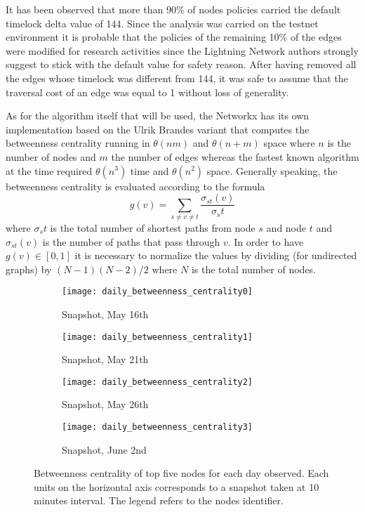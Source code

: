 	It has been observed that more than 90\% of nodes policies carried the default timelock delta value of 144. Since the analysis was carried on the testnet environment it is probable that the policies of the remaining 10\% of the edges were modified for research activities since the Lightning Network authors strongly suggest to stick with the default value for safety reason. After having removed all the edges whose timelock was different from 144, it was safe to assume that the traversal cost of an edge was equal to 1 without loss of generality.
	
	As for the algorithm itself that will be used, the Networkx has its own implementation based on the Ulrik Brandes \cite{Brandes2001} variant that computes the betweenness centrality running in $\theta(nm)$ and $\theta(n + m)$ space where $n$ is the number of nodes and $m$ the number of edges whereas the fastest known algorithm at the time required $\theta(n^3)$ time and $\theta(n^2)$ space.	Generally speaking, the betweenness centrality is evaluated according to the formula 
	\begin{equation}
		g(v) = \sum_{s \neq v \neq t}{\frac{\sigma_{st}(v) }{\sigma_st}}
	\end{equation}
	where $\sigma_st$ is the total number of shortest paths from node $s$ and node $t$ and $\sigma_{st}(v)$ is the number of paths that pass through $v$. In order to have $g(v) \in [0, 1]$ it is necessary to normalize the values by dividing (for undirected graphs) by $(N-1)(N-2)/2$ where $N$ is the total number of nodes.

	\begin{figure}[htbp]
		\centering
		\begin{subfigure}{0.6\textwidth}
			\centering
			\texttt{[image: daily\_betweenness\_centrality0]}
			\caption{Snapshot, May 16th}
			\label{daily_beetwenness0}
		\end{subfigure}
		\begin{subfigure}{0.6\textwidth}
			\centering
			\texttt{[image: daily\_betweenness\_centrality1]}
			\caption{Snapshot, May 21th}
			\label{daily_betweenness1}
		\end{subfigure}
		\begin{subfigure}{0.6\textwidth}
			\centering
			\texttt{[image: daily\_betweenness\_centrality2]}
			\caption{Snapshot, May 26th}
			\label{daily_betweenness2}
		\end{subfigure}
		\begin{subfigure}{0.6\textwidth}
			\centering
			\texttt{[image: daily\_betweenness\_centrality3]}
			\caption{Snapshot, June 2nd}
			\label{daily_betweenness3}
		\end{subfigure}
		
		\caption{Betweenness centrality of top five nodes for each day observed. Each units on the horizontal axis  corresponds to a snapshot taken at 10 minutes interval. The legend refers to the nodes identifier.}
		\label{daily_betweenness}
	\end{figure}	
	
